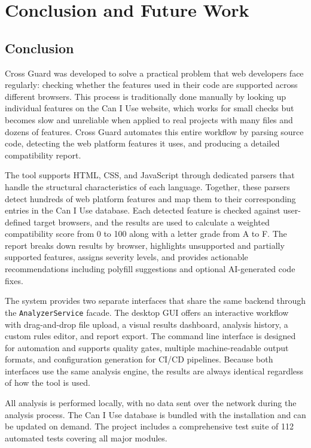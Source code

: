 \chapter{Conclusion and Future Work}
\label{ch:sum}

\section{Conclusion}
\label{sec:conclusion}

Cross Guard was developed to solve a practical problem that web developers face regularly: checking whether the features used in their code are supported across different browsers. This process is traditionally done manually by looking up individual features on the Can I Use website, which works for small checks but becomes slow and unreliable when applied to real projects with many files and dozens of features. Cross Guard automates this entire workflow by parsing source code, detecting the web platform features it uses, and producing a detailed compatibility report.

The tool supports HTML, CSS, and JavaScript through dedicated parsers that handle the structural characteristics of each language. Together, these parsers detect hundreds of web platform features and map them to their corresponding entries in the Can I Use database. Each detected feature is checked against user-defined target browsers, and the results are used to calculate a weighted compatibility score from 0 to 100 along with a letter grade from A to F. The report breaks down results by browser, highlights unsupported and partially supported features, assigns severity levels, and provides actionable recommendations including polyfill suggestions and optional AI-generated code fixes.

The system provides two separate interfaces that share the same backend through the \texttt{AnalyzerService} facade. The desktop GUI offers an interactive workflow with drag-and-drop file upload, a visual results dashboard, analysis history, a custom rules editor, and report export. The command line interface is designed for automation and supports quality gates, multiple machine-readable output formats, and configuration generation for CI/CD pipelines. Because both interfaces use the same analysis engine, the results are always identical regardless of how the tool is used.

All analysis is performed locally, with no data sent over the network during the analysis process. The Can I Use database is bundled with the installation and can be updated on demand. The project includes a comprehensive test suite of 112 automated tests covering all major modules.

